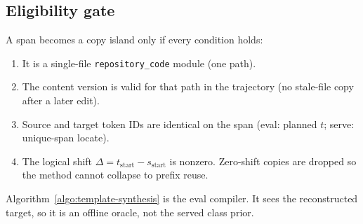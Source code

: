 \subsection{Eligibility gate}

A span becomes a copy island only if every condition holds:

\begin{enumerate}[leftmargin=1.2em,itemsep=0.2em]
    \item It is a single-file \texttt{repository\_code} module (one path).
    \item The content version is valid for that path in the trajectory
          (no stale-file copy after a later edit).
    \item Source and target token IDs are identical on the span
          (eval: planned $t$; serve: unique-span locate).
    \item The logical shift $\Delta = t_{\mathrm{start}} - s_{\mathrm{start}}$
          is nonzero. Zero-shift copies are dropped so the method
          cannot collapse to prefix reuse.
\end{enumerate}

Algorithm~\ref{algo:template-synthesis} is the eval compiler. It sees
the reconstructed target, so it is an offline oracle, not the served
class prior.

\begin{algorithm}[ht]
\SetAlFnt{\footnotesize}
\DontPrintSemicolon
{}
\BlankLine
{}
\caption{Eval compiler: offline-oracle PLAN for job 137185}
\label{algo:template-synthesis}
\end{algorithm}

